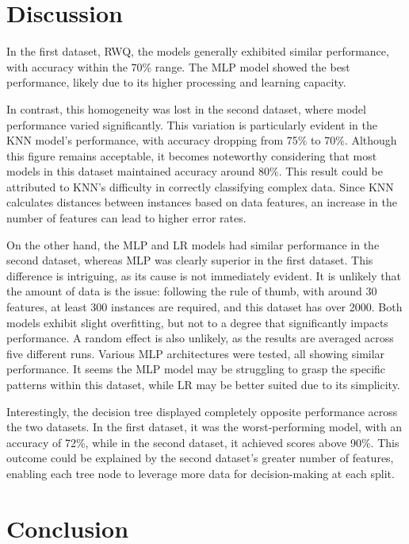 \documentclass[conference]{IEEEtran}
\begin{document}
\section{Discussion}

In the first dataset, RWQ, the models generally exhibited similar performance, with accuracy within the 70\% range. The MLP model showed the best performance, likely due to its higher processing and learning capacity.

In contrast, this homogeneity was lost in the second dataset, where model performance varied significantly. This variation is particularly evident in the KNN model’s performance, with accuracy dropping from 75\% to 70\%. Although this figure remains acceptable, it becomes noteworthy considering that most models in this dataset maintained accuracy around 80\%. This result could be attributed to KNN’s difficulty in correctly classifying complex data. Since KNN calculates distances between instances based on data features, an increase in the number of features can lead to higher error rates.

On the other hand, the MLP and LR models had similar performance in the second dataset, whereas MLP was clearly superior in the first dataset. This difference is intriguing, as its cause is not immediately evident. It is unlikely that the amount of data is the issue: following the rule of thumb, with around 30 features, at least 300 instances are required, and this dataset has over 2000. Both models exhibit slight overfitting, but not to a degree that significantly impacts performance. A random effect is also unlikely, as the results are averaged across five different runs. Various MLP architectures were tested, all showing similar performance. It seems the MLP model may be struggling to grasp the specific patterns within this dataset, while LR may be better suited due to its simplicity.

Interestingly, the decision tree displayed completely opposite performance across the two datasets. In the first dataset, it was the worst-performing model, with an accuracy of 72\%, while in the second dataset, it achieved scores above 90\%. This outcome could be explained by the second dataset’s greater number of features, enabling each tree node to leverage more data for decision-making at each split.

\section{Conclusion}
\end{document}
